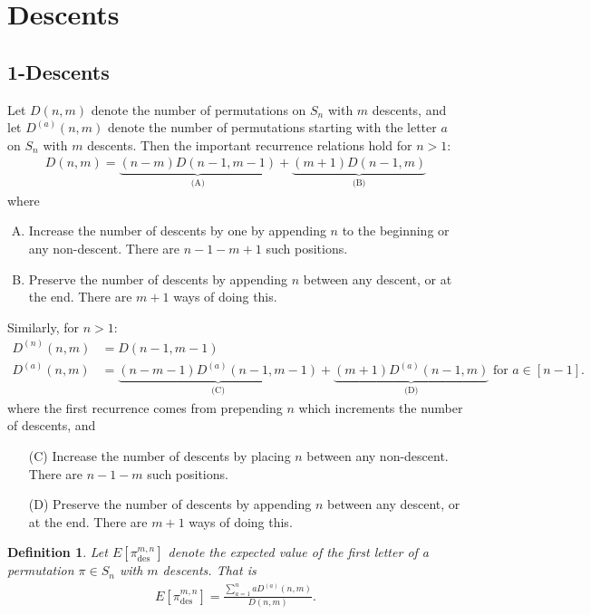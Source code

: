 \documentclass{article}
\newtheorem{definition}[theo]{Definition}
\begin{document}
\section{Descents}
\subsection{1-Descents}
  Let $D(n, m)$ denote the number of permutations on $S_n$ with $m$ descents,
  and let $D^{(a)}(n, m)$ denote the number of permutations starting with the
  letter $a$ on $S_n$ with $m$ descents.
  Then the important recurrence relations hold for $n > 1$: \begin{align}
    D(n, m)
    = \underbrace{(n - m)D(n-1, m-1)}_\text{(A)}
    + \underbrace{(m + 1)D(n-1, m)}_\text{(B)}
  \end{align}
  where \begin{enumerate}[(A)]
    \item Increase the number of descents by one by appending $n$ to the
    beginning or any non-descent. There are $n - 1 - m + 1$ such positions.
    \item Preserve the number of descents by appending $n$ between any descent,
    or at the end. There are $m + 1$ ways of doing this.
  \end{enumerate}
  Similarly, for $n > 1$: \begin{align}
    D^{(n)}(n, m) &= D(n - 1, m - 1) \\
    D^{(a)}(n, m)
    &= \underbrace{(n - m - 1)D^{(a)}(n - 1, m - 1)}_\text{(C)}
    + \underbrace{(m + 1)    D^{(a)}(n - 1, m)    }_\text{(D)} \text{ for } a \in [n-1].
  \end{align} where the first recurrence comes from prepending $n$
  which increments the number of descents, and \begin{enumerate}
    \item[(C)] Increase the number of descents by placing $n$ between
    any non-descent. There are $n - 1 - m$ such positions.
    \item[(D)] Preserve the number of descents by appending $n$ between
    any descent, or at the end. There are $m + 1$ ways of doing this.
  \end{enumerate}
  \begin{definition}
    Let $E[\pi_\text{des}^{m, n}]$ denote the expected value of the first letter of a permutation $\pi \in S_n$ with $m$ descents. That is \begin{align}
      E[\pi_\text{des}^{m, n}] = \frac{\sum_{a=1}^n a D^{(a)}(n, m)}{D(n, m)}.
    \end{align}
  \end{definition}
\end{document}
